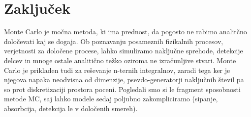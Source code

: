 \documentclass[11pt, a4paper]{article}
\begin{document}
\section{Zaključek}
Monte Carlo je močna metoda, ki ima prednost, da pogosto ne rabimo analitčno določevati kaj se dogaja. Ob poznavanju posameznih fizikalnih procesov, verjetnosti za določene procese, lahko simuliramo naključne sprehode, detekcije delcev in mnoge ostale analitično težko oziroma ne izračunljive stvari. Monte Carlo je prikladen tudi za reševanje n-ternih integralnov, zaradi tega ker je njegova napaka neodvisna od dimenzije, psevdo-generatorji naključnih števil pa so prot diskretizaciji prostora poceni. Pogledali smo si le fragment sposobnosti metode MC, saj lahko modele sedaj poljubno zakompliciramo (sipanje, absorbcija, detekcija le v določenih smereh).
\end{document}
